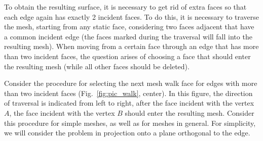 \documentclass[
11pt,%
tightenlines,%
twoside,%
onecolumn,%
nofloats,%
nobibnotes,%
nofootinbib,%
superscriptaddress,%
noshowpacs,%
centertags]%
{revtex4-2}
\begin{document}
To obtain the resulting surface, it is necessary to get rid of extra faces so that each edge again has exactly 2 incident faces.
To do this, it is necessary to traverse the mesh, starting from any static face, considering two faces adjacent that have a common incident edge (the faces marked during the traversal will fall into the resulting mesh).
When moving from a certain face through an edge that has more than two incident faces, the question arises of choosing a face that should enter the resulting mesh (while all other faces should be deleted).

Consider the procedure for selecting the next mesh walk face for edges with more than two incident faces (Fig.~\ref{fig:pic_walk}, center).
In this figure, the direction of traversal is indicated from left to right, after the face incident with the vertex $A$, the face incident with the vertex $B$ should enter the resulting mesh.
Consider this procedure for simple meshes, as well as for meshes in general.
For simplicity, we will consider the problem in projection onto a plane orthogonal to the edge.
\end{document}
